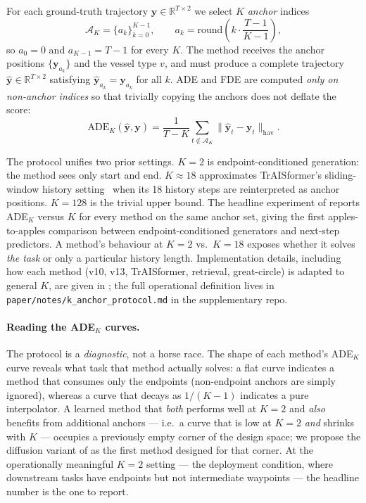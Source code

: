 \documentclass[11pt]{article}
\begin{document}
For each ground-truth trajectory $\mathbf{y} \in \mathbb{R}^{T \times 2}$ we
select $K$ \emph{anchor} indices
\begin{equation}
\mathcal{A}_K = \{a_k\}_{k=0}^{K-1}, \qquad
a_k = \mathrm{round}\!\left(k \cdot \frac{T-1}{K-1}\right),
\end{equation}
so $a_0 = 0$ and $a_{K-1} = T - 1$ for every $K$. The method receives the
anchor positions $\{\mathbf{y}_{a_k}\}$ and the vessel type $v$, and must
produce a complete trajectory $\hat{\mathbf{y}} \in \mathbb{R}^{T \times 2}$
satisfying $\hat{\mathbf{y}}_{a_k} = \mathbf{y}_{a_k}$ for all $k$. ADE and
FDE are computed \emph{only on non-anchor indices} so that trivially
copying the anchors does not deflate the score:
\begin{equation}
\mathrm{ADE}_K(\hat{\mathbf{y}}, \mathbf{y}) = \frac{1}{T - K}
   \sum_{t \notin \mathcal{A}_K} \|\hat{\mathbf{y}}_t - \mathbf{y}_t\|_{\mathrm{hav}}.
\end{equation}

The protocol unifies two prior settings. $K=2$ is endpoint-conditioned
generation: the method sees only start and end. $K \approx 18$ approximates
TrAISformer's sliding-window history setting~\citep{traisformer2024} when
its 18 history steps are reinterpreted as anchor positions. $K=128$ is the
trivial upper bound. The headline experiment of
 reports ADE$_K$ versus $K$ for every method on the
same anchor set, giving the first apples-to-apples comparison between
endpoint-conditioned generators and next-step predictors. A method's
behaviour at $K=2$ vs.\ $K=18$ exposes whether it solves \emph{the task}
or only a particular history length. Implementation details, including
how each method (v10, v13, TrAISformer, retrieval, great-circle) is
adapted to general $K$, are given in
; the full operational definition lives in
\texttt{paper/notes/k\_anchor\_protocol.md} in the supplementary repo.

\paragraph{Reading the ADE$_K$ curves.}
The protocol is a \emph{diagnostic}, not a horse race. The shape of each
method's ADE$_K$ curve reveals what task that method actually solves:
a flat curve indicates a method that consumes only the endpoints
(non-endpoint anchors are simply ignored), whereas a curve that decays
as $1/(K{-}1)$ indicates a pure interpolator. A learned method that
\emph{both} performs well at $K=2$ and \emph{also} benefits from
additional anchors --- i.e.\ a curve that is low at $K=2$ \emph{and}
shrinks with $K$ --- occupies a previously empty corner of the design
space; we propose the diffusion variant of 
as the first method designed for that corner.
At the operationally meaningful $K=2$ setting --- the deployment
condition, where downstream tasks have endpoints but not intermediate
waypoints --- the headline number is the one to report.
\end{document}
